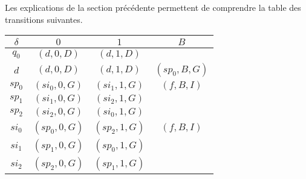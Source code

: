 Les explications de la section précédente permettent de comprendre la table des transitions suivantes.
\begin{center}
	\begin{tabular}{|c||c|c|c|}
		\hline
		$\delta$ 
			& $0$ 
			& $1$
			& $B$ \\
		\hline
		\hline
		$q_0$ 
			& $(d , 0, D)$ 
			& $(d , 1, D)$
			&  \\
		\hline
		$d$ 
			& $(d , 0, D)$ 
			& $(d , 1, D)$
			& $(sp_0, B, G)$ \\
		\hline
		\hline
		$sp_0$ 
			& $(si_0 , 0, G)$ 
			& $(si_1 , 1, G)$
			& $(f    , B, I)$ \\
		\hline
		$sp_1$ 
			& $(si_1 , 0, G)$ 
			& $(si_2 , 1, G)$
			&                 \\
		\hline
		$sp_2$ 
			& $(si_2 , 0, G)$ 
			& $(si_0 , 1, G)$
			&                 \\
		\hline
		\hline
		$si_0$ 
			& $(sp_0 , 0, G)$ 
			& $(sp_2 , 1, G)$
			& $(f    , B, I)$ \\
		\hline
		$si_1$ 
			& $(sp_1 , 0, G)$ 
			& $(sp_0 , 1, G)$
			&                 \\
		\hline
		$si_2$ 
			& $(sp_2 , 0, G)$ 
			& $(sp_1 , 1, G)$
			&                 \\
		\hline
	\end{tabular}
\end{center}